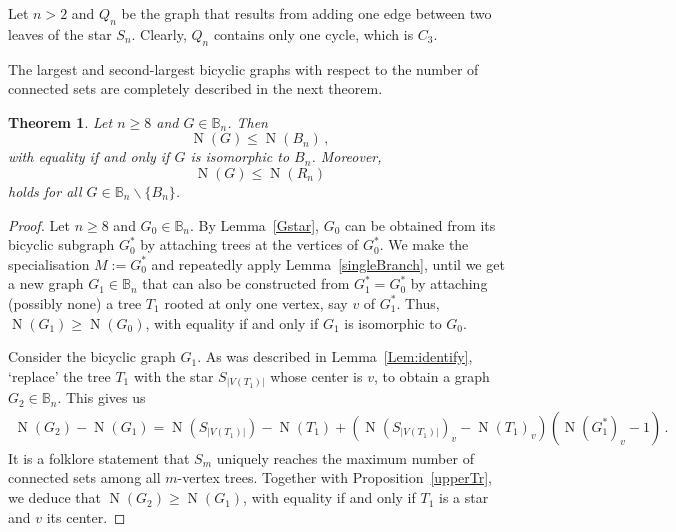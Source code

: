 \documentclass[a4paper,12pt]{amsart}
\newtheorem{theorem}[lemma]{Theorem}
\theoremstyle{remark}
\DeclareMathOperator{\N}{N}
\begin{document}
\medskip
Let $n>2$ and $Q_n$ be the graph that results from adding one edge between two leaves of the star $S_n$. Clearly, $Q_n$ contains only one cycle, which is $C_3$. 

\medskip
The largest and second-largest bicyclic graphs with respect to the number of connected sets are completely described in the next theorem.

\begin{theorem}
Let $n\geq 8$ and $G \in \mathbb{B}_n$. Then
$$\N(G) \leq \N(B_n)\,,$$
with equality if and only if $G$ is isomorphic to $B_n$. Moreover,
$$\N(G) \leq \N(R_n)$$ holds for all $G\in \mathbb{B}_n \backslash \{B_n\}$.
\end{theorem}

\begin{proof}
Let $n\geq 8$ and $G_0 \in \mathbb{B}_n$. By Lemma~\ref{Gstar}, $G_0$ can be obtained from its bicyclic subgraph $G_0^*$ by attaching trees at the vertices of $G_0^*$. We make the specialisation $M:=G_0^*$ and repeatedly apply Lemma~\ref{singleBranch}, until we get a new graph $G_1\in \mathbb{B}_n$ that can also be constructed from $G_1^*=G_0^*$ by attaching (possibly none) a tree $T_1$ rooted at only one vertex, say $v$ of $G_1^*$. Thus, $\N(G_1)\geq \N(G_0)$, with equality if and only if $G_1$ is isomorphic to $G_0$.

\medskip
Consider the bicyclic graph $G_1$. As was described in Lemma~\ref{Lem:identify}, `replace' the tree $T_1$ with the star $S_{|V(T_1)|}$ whose center is $v$, to obtain a graph $G_2\in \mathbb{B}_n$. This gives us
\begin{align*}
\N(G_2)-\N(G_1)=\N(S_{|V(T_1)|}) - \N(T_1) + (\N(S_{|V(T_1)|})_{v} - \N(T_1)_v)(\N(G_1^*)_{v} -1 )\,.
\end{align*}
It is a folklore statement that $S_m$ uniquely reaches the maximum number of connected sets among all $m$-vertex trees. Together with Proposition~\ref{upperTr}, we deduce that $\N(G_2) \geq \N(G_1)$, with equality if and only if $T_1$ is a star and $v$ its center.


\end{proof}
\end{document}
